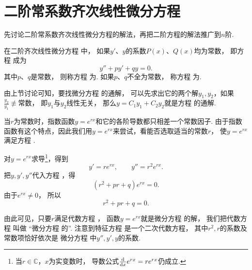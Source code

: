 \section{二阶常系数齐次线性微分方程}\label{section:微分方程.常系数齐次线性微分方程}
先讨论二阶常系数齐次线性微分方程的解法，再把二阶方程的解法推广到\(n\)阶.

\begin{definition}
在二阶齐次线性微分方程  中，
如果\(y'\)、\(y\)的系数\(P(x)\)、\(Q(x)\)均为常数，
即方程  成为
\begin{equation}\label{equation:微分方程.二阶常系数齐次线性微分方程的一般形式}
	y''+py'+qy=0.
\end{equation}
其中\(p\)、\(q\)是常数，
则称方程 
为.
如果\(p\)、\(q\)不全为常数，
称方程 
为.
\end{definition}

由上节讨论可知，要找微分方程  的通解，
可以先求出它的两个解\(y_1, y_2\)，如果\(\frac{y_2}{y_1} \not\equiv \text{常数}\)，
即\(y_1\)与\(y_2\)线性无关，
那么\(y = C_1 y_1 + C_2 y_2\)就是方程  的通解.

当\(r\)为常数时，指数函数\(y = e^{r x}\)和它的各阶导数都只相差一个常数因子.
由于指数函数有这个特点，因此我们用\(y = e^{rx}\)来尝试，看能否选取适当的常数\(r\)，
使\(y = e^{rx}\)满足方程 .

对\(y = e^{rx}\)求导\footnote{当\(r\in\mathbb{C}\)，\(x\)为实变数时，
导数公式\(\dv{x} e^{rx} = r e^{rx}\)仍成立.}，得到\[
	y' = r e^{rx}, \qquad y'' = r^2 e^{rx}.
\]
把\(y,y',y''\)代入方程 ，得\[
	(r^2 + pr + q) e^{rx} = 0.
\]
由于\(e^{rx}\neq0\)，
所以\begin{equation}\label{equation:微分方程.二阶常系数齐次线性微分方程的特征方程}
	r^2 + pr + q = 0.
\end{equation}

由此可见，只要\(r\)满足代数方程 ，
函数\(y = e^{rx}\)就是微分方程  的解，
我们把代数方程  叫做
“微分方程  的”.
注意到特征方程  是一个二次代数方程，
其中\(r^2, r\)的系数及常数项恰好依次是
微分方程  中\(y'',y',y\)的系数.

